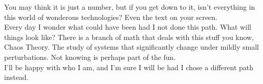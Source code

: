 \documentclass{article}
\begin{document}
You may think it is just a number, but if you get down to it, isn't everything in this world of wonderous technologies? Even the text on your screen.\\

Every day I wonder what could have been had I not done this path. What will things look like? There is a branch of math that deals with this stuff you know, Chaos Theory. The study of systems that significantly change under mildly small perturbations. Not knowing is perhaps part of the fun.\\

I'll be happy with who I am, and I'm sure I will be had I chose a different path instead.\\
\end{document}
